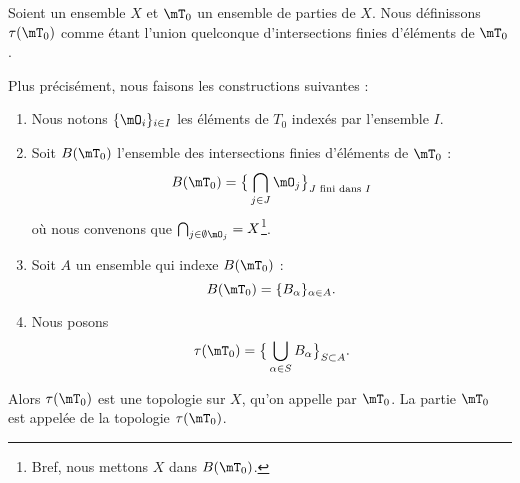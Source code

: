 \begin{propositionDef}\label{DefTopologieEngendree}
    Soient un ensemble \( X \) et \( \mT_0 \) un ensemble de parties de \( X \). Nous définissons \( \tau(\mT_0)\) comme étant l'union quelconque d'intersections finies d'éléments de \( \mT_0 \). 

    Plus précisément, nous faisons les constructions suivantes :
    \begin{enumerate}
        \item
            Nous notons \( \{\mO_i \}_{i\in I}\) les éléments de \( T_0\) indexés par l'ensemble \( I\).
        \item 
            Soit  \( B(\mT_0)\) l'ensemble des intersections finies d'éléments de \( \mT_0\) :
            \begin{equation}
                B(\mT_0)=\big\{ \bigcap_{j\in J}\mO_j \big\}_{J\text{ fini dans }I}
            \end{equation}
            où nous convenons que \( \bigcap_{j\in\emptyset \mO_j}=X\)\footnote{Bref, nous mettons \( X\) dans \( B(\mT_0)\).}.
        \item
            Soit \( A\) un ensemble qui indexe \(   B(\mT_0) \) :
            \begin{equation}
                B(\mT_0)=\{ B_{\alpha} \}_{\alpha\in A}.
            \end{equation}
        \item 
            Nous posons
            \begin{equation}
                \tau(\mT_0)=\big\{    \bigcup_{\alpha\in S}B_{\alpha}   \big\}_{S\subset A}.
            \end{equation}
    \end{enumerate}
    Alors \( \tau(\mT_0) \) est une topologie sur \(X\), qu'on appelle  par \( \mT_0 \). La partie \( \mT_0\) est appelée  de la topologie \(  \tau(\mT_0)  \).
\end{propositionDef}

